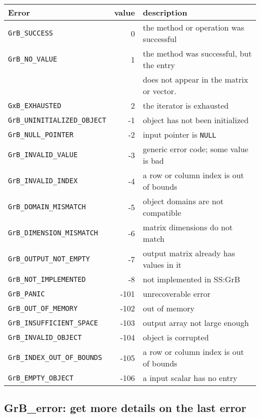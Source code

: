 \documentclass[12pt]{article}
\begin{document}
\vspace{0.2in}
\noindent
{\small
\begin{tabular}{lrp{2.8in}}
\hline
Error                         & value & description \\
\hline
\verb'GrB_SUCCESS'              & 0   & the method or operation was successful \\
\verb'GrB_NO_VALUE'             & 1   & the method was successful, but the entry \\
                                &     & does not appear in the matrix or vector. \\
\verb'GxB_EXHAUSTED'            & 2   & the iterator is exhausted \\
\hline
\hline
\verb'GrB_UNINITIALIZED_OBJECT' & -1   & object has not been initialized \\
\verb'GrB_NULL_POINTER'         & -2   & input pointer is \verb'NULL' \\
\verb'GrB_INVALID_VALUE'        & -3   & generic error code; some value is bad \\
\verb'GrB_INVALID_INDEX'        & -4   & a row or column index is out of bounds \\
\verb'GrB_DOMAIN_MISMATCH'      & -5   & object domains are not compatible \\
\verb'GrB_DIMENSION_MISMATCH'   & -6   & matrix dimensions do not match \\
\verb'GrB_OUTPUT_NOT_EMPTY'     & -7   & output matrix already has values in it \\
\verb'GrB_NOT_IMPLEMENTED'      & -8   & not implemented in SS:GrB \\
\verb'GrB_PANIC'                & -101 & unrecoverable error \\
\verb'GrB_OUT_OF_MEMORY'        & -102 & out of memory \\
\verb'GrB_INSUFFICIENT_SPACE'   & -103 & output array not large enough \\
\verb'GrB_INVALID_OBJECT'       & -104 & object is corrupted \\
\verb'GrB_INDEX_OUT_OF_BOUNDS'  & -105 & a row or column index is out of bounds \\
\verb'GrB_EMPTY_OBJECT'         & -106 & a input scalar has no entry \\
\hline
\end{tabular}
\vspace{0.2in}
}

\newpage
\subsection{{\sf GrB\_error:} get more details on the last error} %
\label{error}
\end{document}

